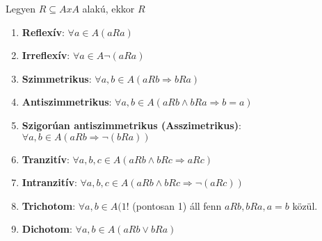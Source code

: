 \begin{frame}
\begin{tcolorbox}[title={Def.: Homogén binér relációk tulajdonságai}]
Legyen $R \subseteq A x A$ alakú, ekkor $R$\\
\begin{enumerate}
\item \textbf{Reflexív}: ${\forall}a \in A (a R a)$
\item \textbf{Irreflexív}: ${\forall}a \in A {\neg}(a R a)$
\item \textbf{Szimmetrikus}: ${\forall}a, b \in A (a R b \Rightarrow b R a)$
\item \textbf{Antiszimmetrikus}: ${\forall}a, b \in A (a R b \land b R a \Rightarrow b = a)$
\item \textbf{Szigorúan antiszimmetrikus (Asszimetrikus)}: ${\forall}a, b \in A (a R b \Rightarrow {\neg}(b R a))$
\item \textbf{Tranzitív}: ${\forall}a, b, c \in A (a R b \land b R c \Rightarrow a R c)$
\item \textbf{Intranzitív}: ${\forall}a, b, c \in A (a R b \land b R c \Rightarrow {\neg}(a R c))$
\item \textbf{Trichotom}: ${\forall}a, b \in A (1!$ (pontosan 1) áll fenn $a R b, b R a, a = b$ közül.
\item \textbf{Dichotom}: ${\forall}a, b \in A (a R b \lor b R a)$
\end{enumerate}
\end{tcolorbox}
\end{frame}

